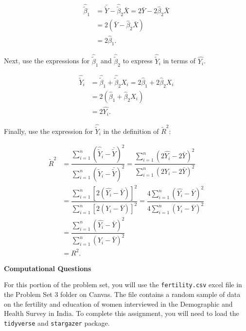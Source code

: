 \documentclass[11pt]{article}
\begin{document}
\begin{onehalfspacing}
\begin{enumerate}
{	\begin{align*}
	\hat{\tilde{\beta}}_1 &= \bar{\tilde{Y}} - \hat{\tilde{\beta}}_2 \bar{X} = 2 \bar{Y} - 2 \hat{\beta}_2 \bar{X} \\
	&= 2(\bar{Y} - \hat{\beta}_2 \bar{X}) \\
	&= 2 \hat{\beta}_1.
	\end{align*}
	
	Next, use the expressions for $\hat{\tilde{\beta}}_1$ and $\hat{\tilde{\beta}}_2$ to express $\hat{\tilde{Y}}_i$ in terms of $\hat{Y_i}$.
	
	\begin{align*}
	\hat{\tilde{Y}}_i &= \hat{\tilde{\beta}}_1 + \hat{\tilde{\beta}}_2X_i = 2 \hat{\beta}_1 + 2 \hat{\beta}_2 X_i \\
	&= 2( \hat{\beta}_1 + \hat{\beta}_2 X_i) \\
	&= 2 \hat{Y_i}.
	\end{align*}
	
	Finally, use the expression for $\hat{\tilde{Y}}_i$ in the definition of $\tilde{R}^2$:
	
	\begin{align*}
	\tilde{R}^2 &= \dfrac{\sum_{i=1}^n (\hat{\tilde{Y}}_i - \bar{\tilde{Y}})^2}{\sum_{i=1}^n (\tilde{Y}_i - \bar{\tilde{Y}})^2} = \dfrac{\sum_{i=1}^n (2 \hat{Y_i} - 2 \bar{Y})^2}{\sum_{i=1}^n (2 Y_i  - 2 \bar{Y})^2} \\
	&= \dfrac{\sum_{i=1}^n [2(\hat{Y_i} - \bar{Y})]^2}{\sum_{i=1}^n [2 (Y_i  - \bar{Y})]^2} = \dfrac{4 \sum_{i=1}^n (\hat{Y_i} - \bar{Y})^2}{4 \sum_{i=1}^n (Y_i  - \bar{Y})^2} \\
	&= \dfrac{\sum_{i=1}^n (\hat{Y_i} - \bar{Y})^2}{\sum_{i=1}^n (Y_i  - \bar{Y})^2} \\
	&= R^2.
	\end{align*}
}
\end{enumerate}

\newpage 

\begin{center}
\textbf{Computational Questions} \bigskip
\end{center}

\noindent For this portion of the problem set, you will use the \texttt{fertility.csv} excel file in the Problem Set 3 folder on Canvas. The file contains a random sample of data on the fertility and education of women interviewed in the Demographic and Health Survey in India. To complete this assignment, you will need to load the \texttt{tidyverse} and \texttt{stargazer} package. \\


\end{onehalfspacing}
\end{document}
